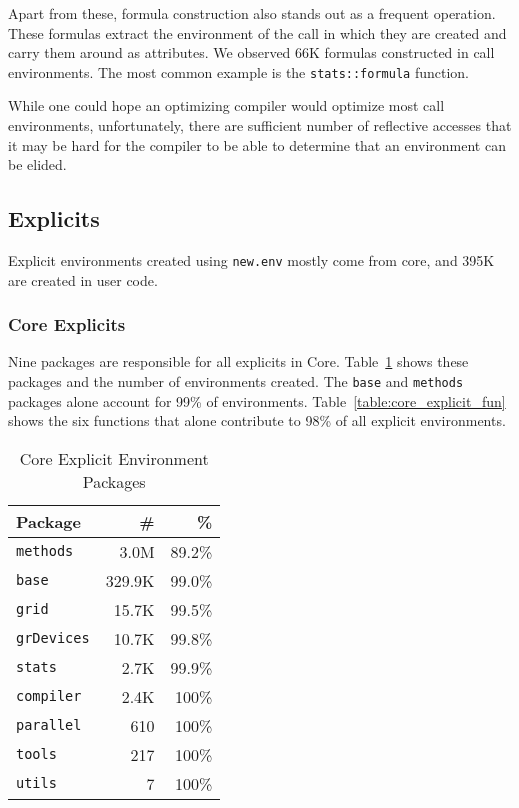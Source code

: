 \documentclass[10pt,sigplan,authorversion=true]{acmart}
\renewcommand{\c}[1]{\lstinline |#1|\xspace}
\newcommand{\newEnv}{\c{new.env}}
\begin{document}
\noindent
Apart from these, formula construction also stands out as a frequent operation.
These formulas extract the environment of the call in which they are created and
carry them around as attributes. We observed 66K formulas constructed in call
environments. The most common example is the \c{stats::formula} function.

While one could hope an optimizing compiler would optimize most call
environments, unfortunately, there are sufficient number of reflective accesses
that it may be hard for the compiler to be able to determine that an environment
can be elided.

\subsection{Explicits}

Explicit environments created using \newEnv mostly come from core, and 395K are
created in user code.

\subsubsection{Core Explicits}

Nine packages are responsible for all explicits in Core.
Table~\ref{table:core_explicit_pack} shows these packages and the number of
environments created. The \c{base} and \c{methods} packages alone account for
99\% of environments. Table~\ref{table:core_explicit_fun} shows the six
functions that alone contribute to 98\% of all explicit environments.

\begin{table}[!h]
  \small
  \caption{Core Explicit Environment Packages} \label{table:core_explicit_pack}
  \centering
  \begin{tabular}{lrr}
    \toprule
    \textbf{Package}&\textbf{\#}&\textbf{\%}\\
    \midrule
    \c{methods}&3.0M&89.2\%\\
    \c{base}&329.9K&99.0\%\\
    \c{grid}&15.7K&99.5\%\\
    \c{grDevices}&10.7K&99.8\%\\
    \c{stats}&2.7K&99.9\%\\
    \c{compiler}&2.4K&100\%\\
    \c{parallel}&610&100\%\\
    \c{tools}&217&100\%\\
    \c{utils}&7&100\%\\
    \bottomrule
  \end{tabular}
\end{table}
\end{document}
